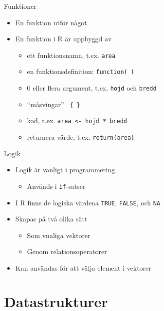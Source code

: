 \documentclass[
  11pt,
  ignorenonframetext,
]{beamer}
\providecommand{\tightlist}{%
  \setlength{\itemsep}{0pt}\setlength{\parskip}{0pt}}
\begin{document}
\begin{frame}{Funktioner}
\label{funktioner}
\begin{itemize}
\tightlist
\item
  En funktion utför något
\item
  En funktion i R är uppbyggd av

  \begin{itemize}
  \tightlist
  \item
    ett funktionsnamn, t.ex. \texttt{area}
  \item
    en funktionsdefinition: \texttt{function( )}
  \item
    0 eller flera argument, t.ex. \texttt{hojd} och \texttt{bredd}
  \item
    ``måsvingar'' \texttt{ \{ \} }
  \item
    kod, t.ex. \texttt{area <- hojd * bredd}
  \item
    returnera värde, t.ex. \texttt{return(area)}
  \end{itemize}
\end{itemize}
\end{frame}

\begin{frame}{Logik}
\label{logik}
\begin{itemize}
\tightlist
\item
  Logik är vanligt i programmering

  \begin{itemize}
  \tightlist
  \item
    Används i \texttt{if}-satser
  \end{itemize}
\item
  I R finns de logiska värdena \texttt{TRUE}, \texttt{FALSE}, och
  \texttt{NA}
\item
  Skapas på två olika sätt

  \begin{itemize}
  \tightlist
  \item
    Som vnaliga vektorer
  \item
    Genom relationsoperatorer
  \end{itemize}
\item
  Kan användas för att välja element i vektorer
\end{itemize}
\end{frame}

\section{Datastrukturer}\label{datastrukturer}
\end{document}
